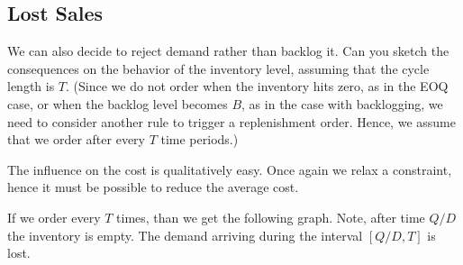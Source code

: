 \subsection{Lost Sales}
\label{sec:lost-sales}

\begin{exercise}We can also decide to reject demand rather than
  backlog it. Can you sketch the consequences on the behavior of the
  inventory level, assuming that the cycle length is $T$. (Since we do not order when the inventory hits zero, as in the EOQ case, or when the backlog level becomes $B$, as in the case with backlogging, we need to consider another rule to trigger a replenishment order. Hence, we assume that we order after every $T$ time periods.)

  \begin{solution}
    The influence on the cost is qualitatively easy. Once again we
    relax a constraint, hence it must be possible to reduce the
    average cost. 

If we order every $T$ times, than we get the following graph. Note, after time $Q/D$ the inventory is empty. The demand arriving during the interval $[Q/D, T]$ is lost. 
\begin{center}
\end{center}
\end{solution}
\end{exercise}

